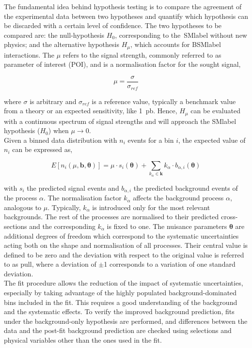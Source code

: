 The fundamental idea behind hypothesis testing is to compare the agreement of the experimental data between two hypotheses and quantify which hypothesis can be discarded with a certain level of confidence. The two hypotheses to be compared are: the null-hypothesis $H_0$, corresponding to the~\acrshort{SMlabel} without new physics; and the alternative hypothesis $H_\mu$, which accounts for \acrshort{BSMlabel} interactions. The $\mu$ refers to the signal strength, commonly referred to as parameter of interest (POI), and is a normalisation factor for the sought signal,

\begin{equation}
    \mu = \frac{\sigma}{\sigma_{ref}}
\end{equation}

where $\sigma$ is arbitrary and $\sigma_{ref}$ is a reference value, typically a benchmark value from a theory or an expected sensitivity, like 1~pb. Hence, $H_\mu$ can be evaluated with a continuous spectrum of signal strengths and will approach the \acrshort{SMlabel} hypothesis ($H_0$) when $\mu\to0$.\\

Given a binned data distribution with $n_i$ events for a bin $i$, the expected value of $n_i$ can be expressed as,

\begin{equation}
    E[n_i(\mu,\mathbf{b},\boldsymbol{\theta})] = \mu\cdot s_i(\boldsymbol{\theta}) + \sum_{k_{\alpha}\in\mathbf{k}}k_\alpha\cdot b_{\alpha,i}(\boldsymbol{\theta})
\end{equation}

with $s_i$ the predicted signal events and $b_{\alpha,i}$ the predicted background events of the process $\alpha$. The normalisation factor $k_\alpha$ affects the background process $\alpha$, analogous to $\mu$. Typically, $k_\alpha$ is introduced only for the most relevant backgrounds. The rest of the processes are normalised to their predicted cross-sections and the corresponding $k_\alpha$ is fixed to one. The nuisance parameters $\boldsymbol{\theta}$ are additional degrees of freedom which correspond to the systematic uncertainties acting both on the shape and normalisation of all processes. Their central value is defined to be zero and the deviation with respect to the original value is referred to as pull, where a deviation of $\pm$1 corresponds to a variation of one standard deviation.\\

The fit procedure allows the reduction of the impact of systematic uncertainties, especially by taking advantage of the highly populated background-dominated bins included in the fit. This requires a good understanding of the background and the systematic effects. To verify the improved background prediction, fits under the background-only hypothesis are performed, and differences between the data and the post-fit background prediction are checked using selections and physical variables other than the ones used in the fit.\\

